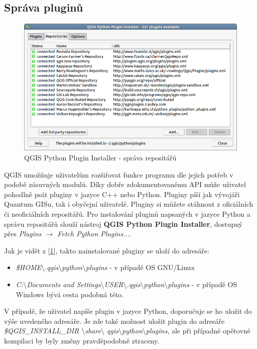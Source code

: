 \subsection{Správa pluginů}
\begin{figure}[h]
	\centering
	\includegraphics[scale=0.5]{pictures/qgis_plugin/python_installer}
	\caption{QGIS Python Plugin Installer - správa repositářů}
  	\label{pythonplugininstaller}
\end{figure}

QGIS umožňuje uživatelům rozšiřovat funkce programu dle jejich potřeb v podobě zásuvných modulů. Díky dobře zdokumentovanému API může uživatel pohodlně psát pluginy v jazyce C++ nebo Python. Pluginy píší jak vývojáři Quantum GISu, tak i obyčejní uživatelé. Pluginy si můžete stáhnout z oficiálních či neoficiálních repositářů. Pro instalování pluginů napsaných v jazyce Python a správu repositářů slouží nástroj \textbf{QGIS Python Plugin Installer}, dostupný přes \textit{Plugins $\rightarrow$ Fetch Python Plugins...}.

\noindent Jak je vidět z [\figurename \ref{pythonplugininstaller}], takto nainstalované pluginy se uloží do adresáře: 

\begin{itemize}
	\item \textit{\$HOME$\setminus$.qgis$\setminus$python$\setminus$plugins} - v případě OS GNU/Linux
	\item \textit{C:$\setminus$Documents and Settings$\setminus$USER$\setminus$.qgis$\setminus$python$\setminus$plugins} - v případě OS Windows bývá cesta podobná této.
\end{itemize}

V případě, že uživatel napíše plugin v jazyce Python, doporučuje se ho uložit do výše uvedeného adresáře. Je zde také možnost uložit plugin do adresáře \textit{\$QGIS\_INSTALL\_DIR $\setminus$share$\setminus$ qgis$\setminus$python$\setminus$plugins}, ale při případné opětovné kompilaci by byly změny pravděpodobně ztraceny.

